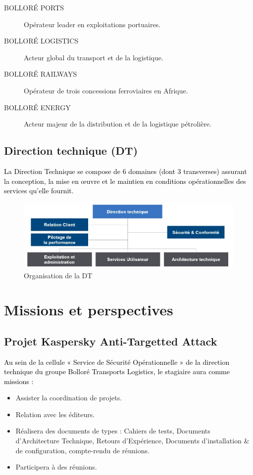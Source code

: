 \documentclass[a4paper,12pt]{report}
\begin{document}
\begin{description}
	\item [BOLLORÉ PORTS] Opérateur leader en exploitations portuaires.
	\item [BOLLORÉ LOGISTICS] Acteur global du transport et de la logistique.
	\item [BOLLORÉ RAILWAYS]  Opérateur de trois concessions ferroviaires en Afrique.
	\item [BOLLORÉ ENERGY] Acteur majeur de la distribution et de la logistique pétrolière.
\end{description}

\subsection{Direction technique (DT) }
\textcolor{black}{La Direction Technique se compose de 6 domaines (dont 3 transverses) assurant la conception, la mise en œuvre et le maintien en conditions opérationnelles des services qu’elle fournit.}
\begin{figure}[H]
	\begin{center}
			\includegraphics[width=1\linewidth]{images_BOLLORE/DT}
	\end{center}
	\caption{Organisation de la DT}
	\label{fig:3}	
\end{figure}

\section{Missions et perspectives }
\subsection{Projet Kaspersky Anti-Targetted Attack}
\textcolor{black}{Au sein de la cellule « Service de Sécurité Opérationnelle  » de la direction technique du groupe Bolloré Transports Logistics, le stagiaire aura comme missions :}
\begin{itemize}
	\item Assister la coordination de projets.
	\item Relation avec les éditeurs.
	\item Réalisera des documents de types : Cahiers de tests, Documents d’Architecture      Technique, Retours d’Expérience, Documents d’installation & de configuration, compte-rendu de réunions.
	\item Participera à des réunions.
\end{itemize}
\end{document}
